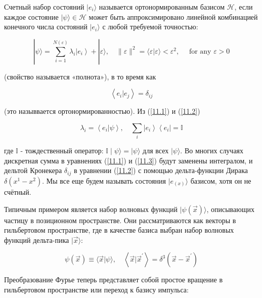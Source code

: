 \documentclass[main.tex]{subfiles}
\begin{document}
Счетный набор состояний $\mid e_i \rangle$ называется ортонормированным базисом $\mathcal H$, если каждое состояние $\mid \psi \rangle \in \mathcal H$ может быть аппроксимировано линейной комбинацией конечного числа состояний $\mid e_i \rangle$ с любой требуемой точностью:

\begin{equation}\label{11.1}
	|\psi\rangle=\sum_{i=1}^{N(\varepsilon)} \lambda_{i}\left|e_{i}\right\rangle+|\varepsilon\rangle, \quad\|\varepsilon\|^{2}=\langle\varepsilon | \varepsilon\rangle<\varepsilon^{2}, \quad \text { for any } \varepsilon>0
\end{equation}

(свойство называется «полнота»), в то время как

\begin{equation}\label{11.2}
	\left\langle e_{i} | e_{j}\right\rangle=\delta_{i j}
\end{equation}
        
(это назыввается ортонормированностью). Из (\ref{11.1}) и (\ref{11.2}) 

\begin{equation}\label{11.3}
	\lambda_{i}=\left\langle e_{i} | \psi\right\rangle, \quad \sum_{i}\left|e_{i}\right\rangle\left\langle e_{i}\right| = \mathbb{I}
\end{equation}

где $\mathbb{I}$ - тождественный оператор: $\mathbb{I}\mid \psi \rangle = \mid \psi \rangle$ для всех $\mid \psi \rangle$.
Во многих случаях дискретная сумма в уравнениях (\ref{11.1}) и (\ref{11.3}) будут заменены интегралом, и дельтой Кронекера $\delta_{ij}$ в уравнении (\ref{11.2}) с помощью дельта-функции Дирака $\delta(x^1 - x^2)$. Мы все еще будем называть состояния $\mid e_{(x)} \rangle$ базисом, хотя он не счётный.

Типичным примером является набор волновых функций $\mid \psi(\vec x) \rangle$, описывающих частицу в позиционном пространстве. Они рассматриваются как векторы в гильбертовом пространстве, где в качестве базиса выбран набор волновых функций дельта-пика $\mid \vec x \rangle$:

\begin{equation}\label{11.4}
	\psi(\vec{x}) \equiv\langle\vec{x} | \psi\rangle, \quad\left\langle\vec{x} | \vec{x}^{\prime}\right\rangle=\delta^{3}\left(\vec{x}-\vec{x}^{\prime}\right)
\end{equation}
             
Преобразование Фурье теперь представляет собой простое вращение в гильбертовом пространстве или переход к базису импульса:
\end{document}
